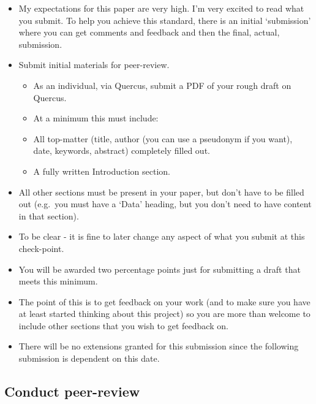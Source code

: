 \documentclass[
]{book}
\providecommand{\tightlist}{%
  \setlength{\itemsep}{0pt}\setlength{\parskip}{0pt}}
\begin{document}
\begin{itemize}
\tightlist
\item
  My expectations for this paper are very high. I'm very excited to read what you submit. To help you achieve this standard, there is an initial `submission' where you can get comments and feedback and then the final, actual, submission.
\item
  Submit initial materials for peer-review.

  \begin{itemize}
  \tightlist
  \item
    As an individual, via Quercus, submit a PDF of your rough draft on Quercus.
  \item
    At a minimum this must include:
  \item
    All top-matter (title, author (you can use a pseudonym if you want), date, keywords, abstract) completely filled out.
  \item
    A fully written Introduction section.
  \end{itemize}
\item
  All other sections must be present in your paper, but don't have to be filled out (e.g.~you must have a `Data' heading, but you don't need to have content in that section).
\item
  To be clear - it is fine to later change any aspect of what you submit at this check-point.
\item
  You will be awarded two percentage points just for submitting a draft that meets this minimum.
\item
  The point of this is to get feedback on your work (and to make sure you have at least started thinking about this project) so you are more than welcome to include other sections that you wish to get feedback on.
\item
  There will be no extensions granted for this submission since the following submission is dependent on this date.
\end{itemize}

\hypertarget{conduct-peer-review}{%
\subsection{Conduct peer-review}\label{conduct-peer-review}}
\end{document}
